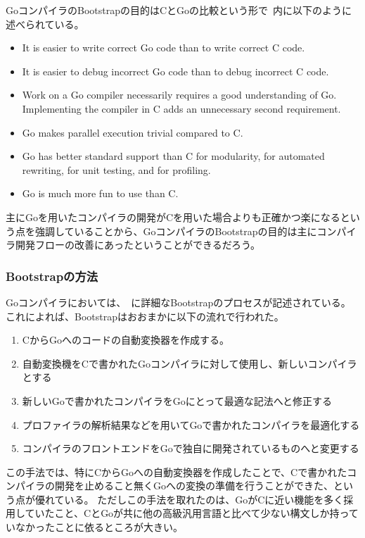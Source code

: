 GoコンパイラのBootstrapの目的はCとGoの比較という形で~\cite{go-compiler-overhaul}内に以下のように述べられている。

\begin{itemize}
\item It is easier to write correct Go code than to write correct C code.
\item It is easier to debug incorrect Go code than to debug incorrect C code.
\item Work on a Go compiler necessarily requires a good understanding of Go. Implementing the compiler in C adds an unnecessary second requirement.
\item Go makes parallel execution trivial compared to C.
\item Go has better standard support than C for modularity, for automated rewriting, for unit testing, and for profiling.
\item Go is much more fun to use than C.
\end{itemize}

主にGoを用いたコンパイラの開発がCを用いた場合よりも正確かつ楽になるという点を強調していることから、GoコンパイラのBootstrapの目的は主にコンパイラ開発フローの改善にあったということができるだろう。

\subsubsection{Bootstrapの方法}

Goコンパイラにおいては、~\cite{go-compiler-overhaul}に詳細なBootstrapのプロセスが記述されている。
これによれば、Bootstrapはおおまかに以下の流れで行われた。

\begin{enumerate}
\item CからGoへのコードの自動変換器を作成する。
\item 自動変換機をCで書かれたGoコンパイラに対して使用し、新しいコンパイラとする
\item 新しいGoで書かれたコンパイラをGoにとって最適な記法へと修正する
\item プロファイラの解析結果などを用いてGoで書かれたコンパイラを最適化する
\item コンパイラのフロントエンドをGoで独自に開発されているものへと変更する
\end{enumerate}

この手法では、特にCからGoへの自動変換器を作成したことで、Cで書かれたコンパイラの開発を止めること無くGoへの変換の準備を行うことができた、という点が優れている。
ただしこの手法を取れたのは、GoがCに近い機能を多く採用していたこと、CとGoが共に他の高級汎用言語と比べて少ない構文しか持っていなかったことに依るところが大きい。

